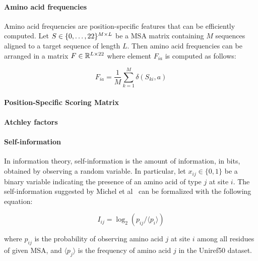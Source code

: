         \paragraph{Amino acid frequencies}

            Amino acid frequencies are position-specific features that can be efficiently computed.
            Let $S \in \{0, \ldots, 22\}^{M \times L}$ be a
            MSA matrix containing $M$ sequences aligned to a target
            sequence of length $L$. Then amino acid frequencies can be arranged
            in a matrix $F \in \mathbb{R}^{L \times 22}$
            where element $F_{ia}$ is computed as follows:

            \begin{equation}
                F_{ia} = \frac{1}{M} \sum\limits_{k=1}^M \delta(S_{ki}, a)
            \end{equation}

        \paragraph{Position-Specific Scoring Matrix}


        \paragraph{Atchley factors}


        \paragraph{Self-information}

            In information theory, self-information is the amount of information, in bits,
            obtained by observing a random variable. In particular, let $x_{ij} \in \{0, 1\}$ be
            a binary variable indicating the presence of an amino acid of type $j$ at site $i$.
            The self-information suggested by Michel et al~\cite{Michel383133} can be formalized
            with the following equation:

            \begin{equation}
                I_{ij} = \log_2 (p_{ij} / \langle p_i \rangle)
            \end{equation}

            where $p_{ij}$ is the probability of observing amino acid $j$ at site $i$ among all residues
            of given MSA, and $\langle p_j \rangle$ is the frequency of amino acid $j$
            in the Uniref50 dataset.

